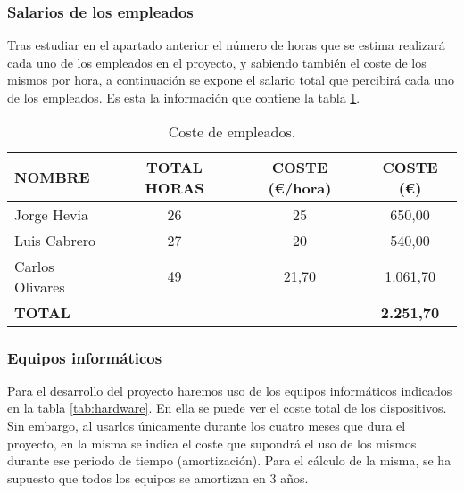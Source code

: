 \subsubsection{Salarios de los empleados}
\par Tras estudiar en el apartado anterior el número de horas que se estima realizará cada uno de los empleados en el proyecto, y sabiendo también el coste de los mismos por hora, a continuación se expone el salario total que percibirá cada uno de los empleados. Es esta la información que contiene la tabla \ref{tab:costePersonal}.

\begin{table}[H]
\begin{center}
\begin{tabular}{l c c c}
\textbf{NOMBRE} & \textbf{TOTAL HORAS} & \textbf{COSTE (\euro/hora)} & \textbf{COSTE (\euro)} \\ \hline \hline
Jorge Hevia & 26 & 25 & 650,00\\
Luis Cabrero & 27 & 20 & 540,00\\
Carlos Olivares & 49 & 21,70 & 1.061,70\\ \hline \hline
\textbf{TOTAL} & & & \textbf{2.251,70} \\ \hline
\end{tabular}
\caption{Coste de empleados.}
\label{tab:costePersonal}
\end{center}
\end{table}



\subsubsection{Equipos informáticos}
\par Para el desarrollo del proyecto haremos uso de los equipos informáticos indicados en la tabla \ref{tab:hardware}. En ella se puede ver el coste total de los dispositivos. Sin embargo, al usarlos únicamente durante los cuatro meses que dura el proyecto, en la misma se indica el coste que supondrá el uso de los mismos durante ese periodo de tiempo (amortización). Para el cálculo de la misma, se ha supuesto que todos los equipos se amortizan en 3 años.

